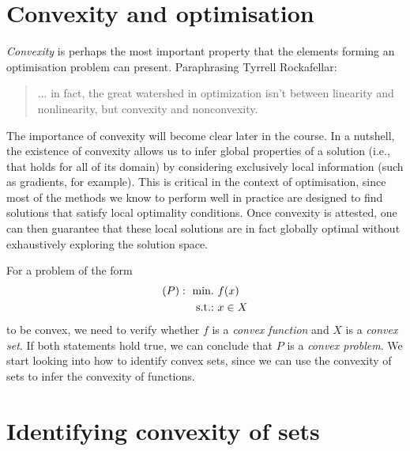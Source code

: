 

\section{Convexity and optimisation}

\emph{Convexity} is perhaps the most important property that the elements forming an optimisation problem can present. Paraphrasing Tyrrell Rockafellar:

\begin{quote}
... in fact, the great watershed in optimization isn't between linearity and nonlinearity, but convexity and nonconvexity.
\end{quote}

The importance of convexity will become clear later in the course. In a nutshell, the existence of convexity allows us to infer global properties of a solution (i.e., that holds for all of its domain) by considering exclusively local information (such as gradients, for example). This is critical in the context of optimisation, since most of the methods we know to perform well in practice are designed to find solutions that satisfy local optimality conditions. Once convexity is attested, one can then guarantee that these local solutions are in fact globally optimal without exhaustively exploring the solution space. 

For a problem of the form
% 
\begin{align*}
    (P) :~ \mathop{\text{min.~}} & f(x) \\
    \mathop{\text{s.t.:~}} & x \in X
\end{align*}
%
to be convex, we need to verify whether $f$ is a \emph{convex function} and $X$ is a \emph{convex set}. If both statements hold true, we can conclude that $P$ is a \emph{convex problem}. We start looking into how to identify convex sets, since we can use the convexity of sets to infer the convexity of functions.


\section{Identifying convexity of sets}
 
